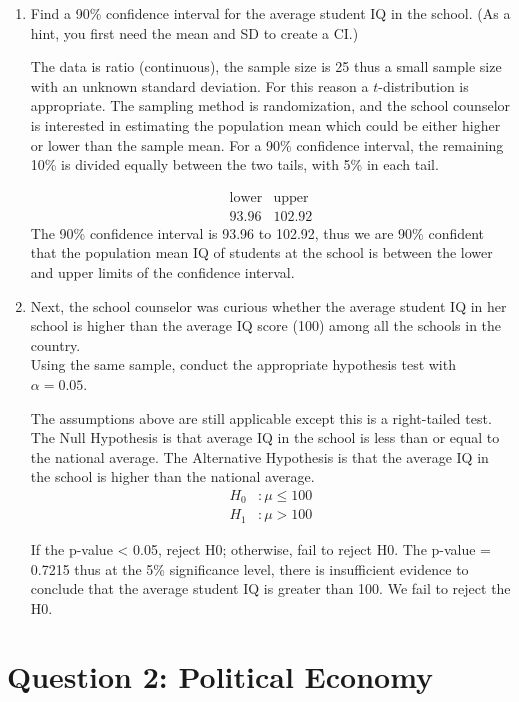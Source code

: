 \documentclass[12pt,letterpaper]{article}
\begin{document}
\begin{enumerate}
\item Find a 90\% confidence interval for the average student IQ in the school. 
(As a hint, you first need the mean and SD to create a CI.)

The data is ratio (continuous), the sample size is 25 thus a small sample size with an unknown standard deviation. For this reason a $t$-distribution is appropriate. The sampling method is randomization, and the school counselor is interested in estimating the population mean which could be either higher or lower than the sample mean. For a 90\% confidence interval, the remaining 10\% is divided equally between the two tails, with 5\% in each tail.
	
\[
\begin{array}{c|c}
	\text{lower} & \text{upper} \\
	\hline
	93.96 & 102.92
\end{array}
\]
The 90\% confidence interval is 93.96 to 102.92, thus we are 90\% confident that the population mean IQ of students at the school is between the lower and upper limits of the confidence interval.

	\item Next, the school counselor was curious  whether  the average student IQ in her school is higher than the average IQ score (100) among all the schools in the country.\\ 
	\noindent Using the same sample, conduct the appropriate hypothesis test with $\alpha=0.05$.

The assumptions above are still applicable except this is a right-tailed test. The Null Hypothesis is that average IQ in the school is less than or equal to the national average. The Alternative Hypothesis is that the average IQ in the school is higher than the national average.
\[
\begin{aligned}
	H_0 &: \mu \leq 100 \\
	H_1 &: \mu > 100
\end{aligned}
\]
		
If the p-value < 0.05, reject H0; otherwise, fail to reject H0. The p-value = 0.7215 thus at the 5\% significance level, there is insufficient evidence to conclude that the average student IQ is greater than 100. We fail to reject the H0.
\end{enumerate}

\newpage

	\section*{Question 2: Political Economy}
\end{document}
